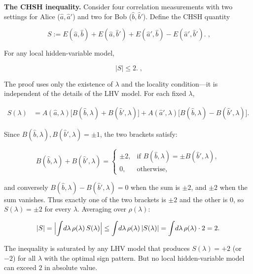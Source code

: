 \medskip\noindent\textbf{The CHSH inequality.}
Consider four correlation measurements with two settings for Alice ($\hat{a}, \hat{a}'$) and two for Bob ($\hat{b}, \hat{b}'$). Define the CHSH quantity
\begin{linenomath}
\begin{equation}
\boxed{\;
S := E(\hat{a},\hat{b}) + E(\hat{a},\hat{b}') + E(\hat{a}',\hat{b}) - E(\hat{a}',\hat{b}').
\;},
\end{equation}
\end{linenomath}
For any local hidden-variable model,
\begin{linenomath}
\begin{equation}
\boxed{\;
\lvert S\rvert \le 2.
\;},
\label{eq:chsh-inequality}
\end{equation}
\end{linenomath}

The proof uses only the existence of $\lambda$ and the locality condition---it is independent of the details of the LHV model. For each fixed $\lambda$,
\begin{linenomath}
\begin{align}
S(\lambda)
&= A(\hat{a},\lambda)\bigl[B(\hat{b},\lambda) + B(\hat{b}',\lambda)\bigr]
+ A(\hat{a}',\lambda)\bigl[B(\hat{b},\lambda) - B(\hat{b}',\lambda)\bigr].
\end{align}
\end{linenomath}
Since $B(\hat{b},\lambda), B(\hat{b}',\lambda) = \pm 1$, the two brackets satisfy:
\begin{linenomath}
\begin{equation}
B(\hat{b},\lambda) + B(\hat{b}',\lambda) =
\begin{cases}
\pm 2, & \text{if } B(\hat{b},\lambda) = \pm B(\hat{b}',\lambda), \\
0, & \text{otherwise},
\end{cases}
\end{equation}
\end{linenomath}
and conversely $B(\hat{b},\lambda) - B(\hat{b}',\lambda) = 0$ when the sum is $\pm2$, and $\pm2$ when the sum vanishes. Thus exactly one of the two brackets is $\pm2$ and the other is $0$, so $S(\lambda) = \pm2$ for every $\lambda$. Averaging over $\rho(\lambda)$:
\begin{linenomath}
\begin{equation}
\lvert S\rvert
= \Bigl\lvert\int\!d\lambda\,\rho(\lambda)\,S(\lambda)\Bigr\rvert
\le \int\!d\lambda\,\rho(\lambda)\,\lvert S(\lambda)\rvert
= \int\!d\lambda\,\rho(\lambda)\cdot 2
= 2.
\end{equation}
\end{linenomath}
The inequality is saturated by any LHV model that produces $S(\lambda) = +2$ (or $-2$) for all $\lambda$ with the optimal sign pattern. But no local hidden-variable model can exceed $2$ in absolute value.

